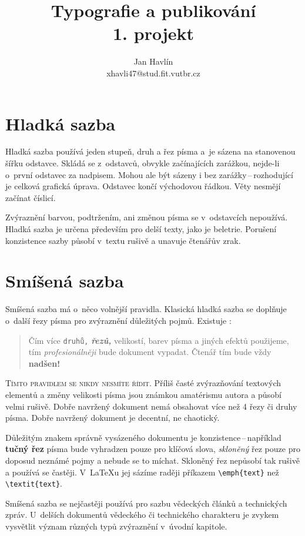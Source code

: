 \documentclass[10pt,twocolumn,a4paper]{article}
\title{Typografie a publikování \\
{\large1. projekt}}
\author{Jan Havlín \\
xhavli47@stud.fit.vutbr.cz}
\date{}
\begin{document}
\maketitle
\section{Hladká sazba}
Hladká sazba používá jeden stupeň, druh a řez písma a~je sázena na stanovenou šířku odstavce. Skládá se z~odstavců, obvykle začínajících zarážkou, nejde-li o~první odstavec za nadpisem. Mohou ale být sázeny i bez zarážky\,--\,rozhodující je celková grafická úprava. Odstavec končí východovou řádkou. Věty nesmějí začínat číslicí.

Zvýraznění barvou, podtržením, ani změnou písma se v~odstavcích nepoužívá. Hladká sazba je určena především pro delší texty, jako je beletrie. Porušení konzistence sazby působí v~textu rušivě a unavuje čtenářův zrak.

\section{Smíšená sazba} \label{sec:smisena}

Smíšená sazba má o~něco volnější pravidla. Klasická hladká sazba se doplňuje o~další řezy písma pro zvýraznění důležitých pojmů. Existuje :

\begin{quotation}
Čím více \texttt{druhů,} \emph{\textbf{řezů,}} velikostí, barev písma a {\selectfont jiných efektů} použijeme, tím \emph{profesionálněji} bude dokument vypadat. Čtenář tím {\tiny bude} vždy {\huge \textbf{nadšen!}}
\end{quotation}

\textsc{Tímto pravidlem se nikdy nesmíte řídit.} Příliš časté zvýrazňování textových elementů a změny velikosti písma jsou známkou amatérismu autora a působí velmi rušivě. Dobře navržený dokument nemá obsahovat více než
4 řezy či druhy písma. Dobře navržený dokument je decentní, ne chaotický.

Důležitým znakem správně vysázeného dokumentu je konzistence\,--\,například \textbf{tučný řez} písma bude vyhradzen pouze pro klíčová slova, \emph{skloněný} řez pouze pro doposud neznámé pojmy a nebude se to míchat. Skloněný řez nepůsobí tak rušivě a používá se častěji. V~\LaTeX u jej sázíme raději příkazem \verb|\emph{text}| než \verb|\textit{text}|.

Smíšená sazba se nejčastěji používá pro sazbu vědeckých článků a technických zpráv. U~delších dokumentů vědeckého či technického charakteru je zvykem vysvětlit význam různých typů zvýraznění v~úvodní kapitole.
\end{document}
